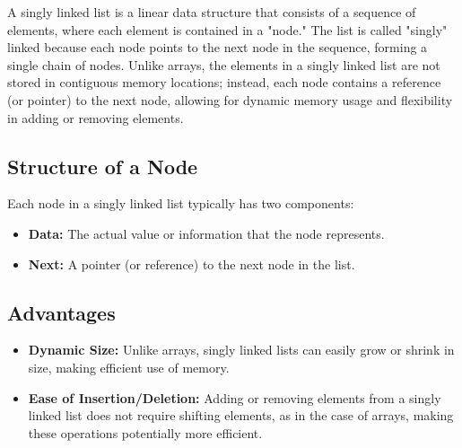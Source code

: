 \documentclass{report}
\begin{document}
    \pagebreak 
    \bigbreak \noindent 
    \begin{concept}
        A singly linked list is a linear data structure that consists of a sequence of elements, where each element is contained in a "node." The list is called "singly" linked because each node points to the next node in the sequence, forming a single chain of nodes. Unlike arrays, the elements in a singly linked list are not stored in contiguous memory locations; instead, each node contains a reference (or pointer) to the next node, allowing for dynamic memory usage and flexibility in adding or removing elements.
        \bigbreak \noindent 
        \subsection{Structure of a Node}
        \bigbreak \noindent 
        Each node in a singly linked list typically has two components:
        \begin{itemize}
            \item \textbf{Data:} The actual value or information that the node represents.
            \item \textbf{Next:} A pointer (or reference) to the next node in the list.
        \end{itemize}

        \bigbreak \noindent 
        \subsection{Advantages}
        \begin{itemize}
            \item \textbf{Dynamic Size:} Unlike arrays, singly linked lists can easily grow or shrink in size, making efficient use of memory.
            \item \textbf{Ease of Insertion/Deletion:} Adding or removing elements from a singly linked list does not require shifting elements, as in the case of arrays, making these operations potentially more efficient.
        \end{itemize}
        \bigbreak \noindent 

\end{concept}
\end{document}
